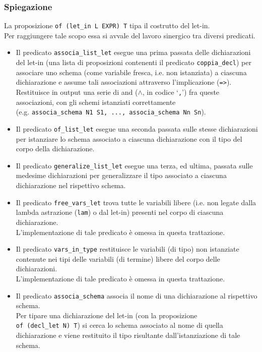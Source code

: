 \documentclass[12pt,a4paper,openright,twoside]{report}
\begin{document}
\subsubsection{Spiegazione}
La proposizione \verb"of (let_in L EXPR) T" tipa il costrutto del let-in.\\
Per raggiungere tale scopo essa si avvale del lavoro sinergico tra diversi predicati.
\begin{itemize}
 \item Il predicato \verb"associa_list_let" esegue una prima passata delle dichiarazioni del let-in (una lista di proposizioni contenenti il predicato \verb"coppia_decl") per associare uno schema (come variabile fresca, i.e. non istanziata) a ciascuna dichiarazione e assume tali associazioni attraverso l'implicazione (\verb"=>").\\
 Restituisce in output una serie di and ($\wedge$, in codice `\verb","') fra queste associazioni, con gli schemi istanziati correttamente\\
 (e.g. \verb"associa_schema N1 S1, ..., associa_schema Nn Sn").
 \item Il predicato \verb"of_list_let" esegue una seconda passata sulle stesse dichiarazioni per istanziare lo schema associato a ciascuna dichiarazione con il tipo del corpo della dichiarazione.
 \item Il predicato \verb"generalize_list_let" esegue una terza, ed ultima, passata sulle medesime dichiarazioni per generalizzare il tipo associato a ciascuna dichiarazione nel rispettivo schema.
 \item Il predicato \verb"free_vars_let" trova tutte le variabili libere (i.e. non legate dalla lambda astrazione (\verb"lam") o dal let-in) presenti nel corpo di ciascuna dichiarazione.\\
 L'implementazione di tale predicato è omessa in questa trattazione.
 \item Il predicato \verb"vars_in_type" restituisce le variabili (di tipo) non istanziate contenute nei tipi delle variabili (di termine) libere del corpo delle dichiarazioni.\\
 L'implementazione di tale predicato è omessa in questa trattazione.
 \item Il predicato \verb"associa_schema" associa il nome di una dichiarazione al rispettivo schema.\\
 Per tipare una dichiarazione del let-in (con la proposizione\\
 \verb"of (decl_let N) T") si cerca lo schema associato al nome di quella dichiarazione e viene restituito il tipo risultante dall'istanziazione di tale schema.

\end{itemize}
\end{document}
